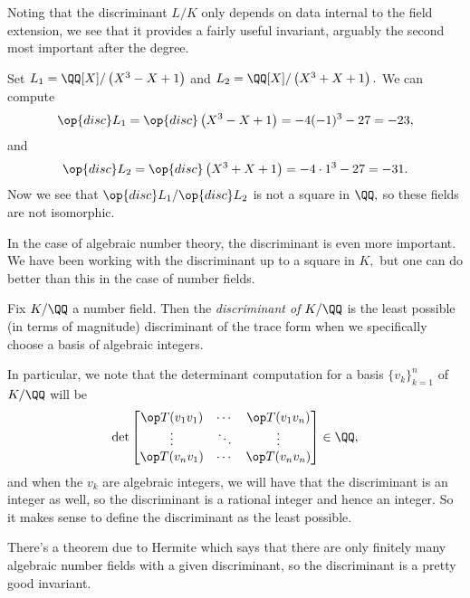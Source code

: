 \documentclass[../notes.tex]{subfiles}
\begin{document}
Noting that the discriminant $L/K$ only depends on data internal to the field extension, we see that it provides a fairly useful invariant, arguably the second most important after the degree.
\begin{example}
	Set $L_1=\QQ[X]/\left(X^3-X+1\right)$ and $L_2=\QQ[X]/\left(X^3+X+1\right).$ We can compute
	\[\op{disc}L_1=\op{disc}\left(X^3-X+1\right)=-4(-1)^3-27=-23,\]
	and
	\[\op{disc}L_2=\op{disc}\left(X^3+X+1\right)=-4\cdot1^3-27=-31.\]
	Now we see that $\op{disc}L_1/\op{disc}L_2$ is not a square in $\QQ,$ so these fields are not isomorphic.
\end{example}
In the case of algebraic number theory, the discriminant is even more important. We have been working with the discriminant up to a square in $K,$ but one can do better than this in the case of number fields.
\begin{definition}
	Fix $K/\QQ$ a number field. Then the \textit{discriminant of $K/\QQ$} is the least possible (in terms of magnitude) discriminant of the trace form when we specifically choose a basis of algebraic integers.
\end{definition}
In particular, we note that the determinant computation for a basis $\{v_k\}_{k=1}^n$ of $K/\QQ$ will be
\[\det\begin{bmatrix}
	\op T(v_1v_1) & \cdots & \op T(v_1v_n) \\
	\vdots & \ddots & \vdots \\
	\op T(v_nv_1) & \cdots & \op T(v_nv_n)
\end{bmatrix}\in\QQ,\]
and when the $v_k$ are algebraic integers, we will have that the discriminant is an integer as well, so the discriminant is a rational integer and hence an integer. So it makes sense to define the discriminant as the least possible.
\begin{remark}
	There's a theorem due to Hermite which says that there are only finitely many algebraic number fields with a given discriminant, so the discriminant is a pretty good invariant.
\end{remark}
\end{document}

